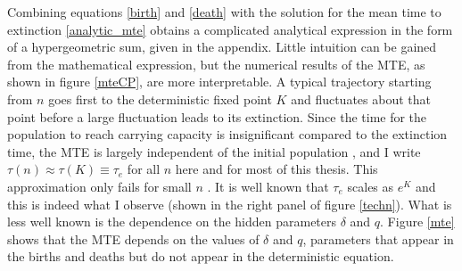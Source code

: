 Combining equations \ref{birth} and \ref{death} with the solution for the mean time to extinction \ref{analytic_mte} obtains a complicated analytical expression in the form of a hypergeometric sum, given in the appendix. 
Little intuition can be gained from the mathematical expression, but the numerical results of the MTE, as shown in figure \ref{mteCP}, are more interpretable. 
A typical trajectory starting from $n$ goes first to the deterministic fixed point $K$ and fluctuates about that point before a large fluctuation leads to its extinction. 
Since the time for the population to reach carrying capacity is insignificant compared to the extinction time, the MTE is largely independent of the initial population \cite{Chotibut2015}, and I write $\tau(n) \approx \tau(K) \equiv \tau_e$ for all $n$ here and for most of this thesis. %
This approximation only fails for small $n$ \cite{Chotibut2015}. %
It is well known that $\tau_e$ scales as $e^K$ \cite{Lande1993,Ovaskainen2010} and this is indeed what I observe (shown in the right panel of figure \ref{techn}). %
What is less well known is the dependence on the hidden parameters $\delta$ and $q$. %
Figure \ref{mte} shows that the MTE depends on the values of $\delta$ and $q$, parameters that appear in the births and deaths but do not appear in the deterministic equation. %


